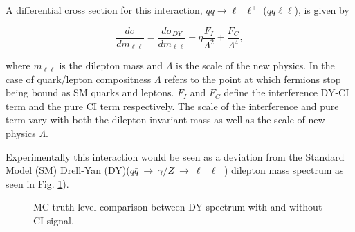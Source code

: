         A differential cross section for this interaction, $q\bar{q} \rightarrow \ell^{-}\ell^{+}$ ($qq\ell\ell$), is given by

        \begin{equation}
            \frac{d\sigma}{dm_{\ell\ell}} = 
                \frac{d\sigma_{DY}}{dm_{\ell\ell}} 
                - \eta\frac{F_{I}}{\Lambda^{2}} 
                + \frac{F_{C}}{\Lambda^{4}},
            \label{eq:DiffCross}
        \end{equation}

        where $m_{\ell\ell}$ is the dilepton mass and $\Lambda$ is the scale of the new physics. In the case of quark/lepton compositness $\Lambda$ refers to the point at which fermions stop being bound as SM quarks and leptons. $F_{I}$ and $F_{C}$ define the interference DY-CI term and the pure CI term respectively. The scale of the interference and pure term vary with both the dilepton invariant mass as well as the scale of new physics $\Lambda$.

        Experimentally this interaction would be seen as a deviation from the Standard Model (SM) Drell-Yan (DY)($q\bar{q}~\rightarrow~\gamma/Z~\rightarrow~\ell^{+}\ell^{-}$) dilepton mass spectrum as seen in Fig. \ref{fig:theoryInvMass}). 

        \begin{figure}[h]
            \begin{center}
            \end{center}
            \caption{MC truth level comparison between DY spectrum with and without CI signal.}
            \label{fig:theoryInvMass}
        \end{figure}

    

